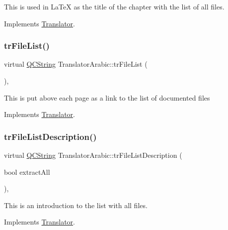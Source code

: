This is used in La\+TeX as the title of the chapter with the list of all files. 

Implements \mbox{\hyperlink{class_translator}{Translator}}.

\mbox{\label{class_translator_arabic_a5524b85023dedf84436fb7fabb517f1d}} 
\subsubsection{\texorpdfstring{trFileList()}{trFileList()}}
{\footnotesize\ttfamily virtual \mbox{\hyperlink{class_q_c_string}{Q\+C\+String}} Translator\+Arabic\+::tr\+File\+List (\begin{DoxyParamCaption}{ }\end{DoxyParamCaption})\hspace{0.3cm}{\ttfamily [inline]}, {\ttfamily [virtual]}}

This is put above each page as a link to the list of documented files 

Implements \mbox{\hyperlink{class_translator}{Translator}}.

\mbox{\label{class_translator_arabic_a04dd144ae8e429fd38839c3a9686c565}} 
\subsubsection{\texorpdfstring{trFileListDescription()}{trFileListDescription()}}
{\footnotesize\ttfamily virtual \mbox{\hyperlink{class_q_c_string}{Q\+C\+String}} Translator\+Arabic\+::tr\+File\+List\+Description (\begin{DoxyParamCaption}\item[{bool}]{extract\+All }\end{DoxyParamCaption})\hspace{0.3cm}{\ttfamily [inline]}, {\ttfamily [virtual]}}

This is an introduction to the list with all files. 

Implements \mbox{\hyperlink{class_translator}{Translator}}.

\mbox{\label{class_translator_arabic_a92d2b70c24f76e57bbc85c1a319e2f9b}} 
